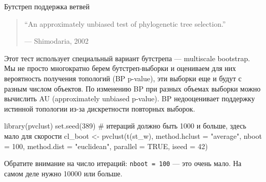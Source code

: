 \documentclass[
  ignorenonframetext,
  russian,
]{beamer}
\newenvironment{Shaded}{\begin{snugshade}}{\end{snugshade}}
\newcommand{\AttributeTok}[1]{\textcolor[rgb]{0.40,0.45,0.13}{#1}}
\newcommand{\CommentTok}[1]{\textcolor[rgb]{0.37,0.37,0.37}{#1}}
\newcommand{\ConstantTok}[1]{\textcolor[rgb]{0.56,0.35,0.01}{#1}}
\newcommand{\DecValTok}[1]{\textcolor[rgb]{0.68,0.00,0.00}{#1}}
\newcommand{\FunctionTok}[1]{\textcolor[rgb]{0.28,0.35,0.67}{#1}}
\newcommand{\NormalTok}[1]{\textcolor[rgb]{0.00,0.23,0.31}{#1}}
\newcommand{\OtherTok}[1]{\textcolor[rgb]{0.00,0.23,0.31}{#1}}
\newcommand{\StringTok}[1]{\textcolor[rgb]{0.13,0.47,0.30}{#1}}
\begin{document}
\begin{frame}[fragile]{Бутстреп поддержка ветвей}
\protect{}\label{ux431ux443ux442ux441ux442ux440ux435ux43f-ux43fux43eux434ux434ux435ux440ux436ux43aux430-ux432ux435ux442ux432ux435ux439}
\begin{quote}
``An approximately unbiased test of phylogenetic tree selection.''

--- Shimodaria, 2002
\end{quote}

Этот тест использует специальный вариант бутстрепа --- multiscale
bootstrap. Мы не просто многократно берем бутстреп-выборки и оцениваем
для них вероятность получения топологий (BP p-value), эти выборки еще и
будут с разным числом объектов. По изменению BP при разных объемах
выборки можно вычислить AU (approximately unbiased p-value). BP
недооценивает поддержку истинной топологии из-за дискретности повторных
выборок.

\scriptsize

\begin{Shaded}
\begin{Highlighting}[]
\FunctionTok{library}\NormalTok{(pvclust)}
\FunctionTok{set.seed}\NormalTok{(}\DecValTok{389}\NormalTok{)}
\CommentTok{\# итераций должно быть 1000 и больше, здесь мало для скорости}
\NormalTok{cl\_boot }\OtherTok{\textless{}{-}} \FunctionTok{pvclust}\NormalTok{(}\FunctionTok{t}\NormalTok{(st\_w), }\AttributeTok{method.hclust =} \StringTok{"average"}\NormalTok{, }\AttributeTok{nboot =} \DecValTok{100}\NormalTok{, }
                   \AttributeTok{method.dist =} \StringTok{"euclidean"}\NormalTok{, }\AttributeTok{parallel =} \ConstantTok{TRUE}\NormalTok{, }\AttributeTok{iseed =} \DecValTok{42}\NormalTok{)}
\end{Highlighting}
\end{Shaded}

\footnotesize

Обратите внимание на число итераций: \texttt{nboot\ =\ 100} --- это
очень мало. На самом деле нужно 10000 или больше.
\end{frame}
\end{document}
